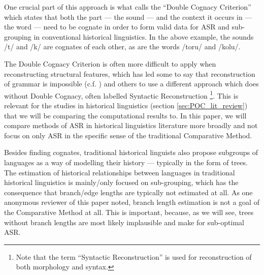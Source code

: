 \documentclass[12pt,letterpaper]{article}
\begin{document}
One crucial part of this approach is what \citet{walkden_2013} calls the ``Double Cognacy Criterion'' which states that both the part --- the sound --- and the context it occurs in --- the word --- need to be cognate in order to form valid data for ASR and sub-grouping in conventional historical linguistics. In the above example, the sounds /t/ and /k/ are cognates of each other, as are the words /toru/ and /kolu/.

The Double Cognacy Criterion is often more difficult to apply when reconstructing structural features, which has led some to say that reconstruction of grammar is impossible (c.f. \citet{lightfoot_2002b}) and others to use a different approach which does without Double Cognacy, often labelled Syntactic Reconstruction \citep[17]{clark1973aspects}\footnote{Note that the term ``Syntactic Reconstruction'' is used for reconstruction of both morphology and syntax.}. This is relevant for the studies in historical linguistics (section \ref{sec:POC_lit_review}) that we will be comparing the computational results to. In this paper, we will compare methods of ASR in historical linguistics literature more broadly and not focus on only ASR in the specific sense of the traditional Comparative Method.




Besides finding cognates, traditional historical linguists also propose subgroups of languages as a way of modelling their history --- typically in the form of trees. The estimation of historical relationships between languages in traditional historical linguistics is mainly/only focused on sub-grouping, which has the consequence that branch/edge lengths are typically not estimated at all. As one anonymous reviewer of this paper noted, branch length estimation is not a goal of the Comparative Method at all. This is important, because, as we will see, trees without branch lengths are most likely implausible and make for sub-optimal ASR.
\end{document}
